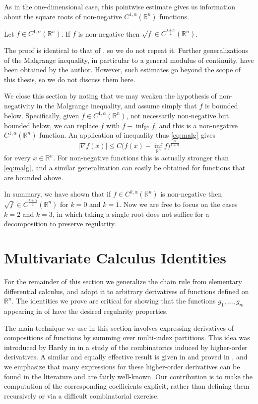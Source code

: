 \documentclass[oneside,hidelinks,indentfirst,10pt]{book}
\begin{document}
As in the one-dimensional case, this pointwise estimate gives us information about the square roots of non-negative \(C^{1,\alpha}(\mathbb{R}^n)\) functions.

\begin{cor}
Let \(f\in C^{1,\alpha}(\mathbb{R}^n)\). If \(f\) is non-negative then \(\sqrt{f}\in C^{\frac{1+\alpha}{2}}(\mathbb{R}^n)\).
\end{cor}


The proof is identical to that of , so we do not repeat it. Further generalizations of the Malgrange inequality, in particular to a general modulus of continuity, have been obtained by the author. However, such estimates go beyond the scope of this thesis, so we do not discuss them here. 


We close this section by noting that we may weaken the hypothesis of non-negativity in the Malgrange inequality, and assume simply that \(f\) is bounded below. Specifically, given \(f\in C^{1,\alpha}(\mathbb{R}^n)\), not necessarily non-negative but bounded below, we can replace \(f\) with \(f-\inf_{\mathbb{R}^n}f\), and this is a non-negative \(C^{1,\alpha}(\mathbb{R}^n)\) function. An application of inequality thus \eqref{eq:malg} gives
\[
    |\nabla f(x)|\leq C\big(f(x)-\inf_{\mathbb{R}^n} f\big)^\frac{\alpha}{1+\alpha}
\]
for every \(x\in\mathbb{R}^n\). For non-negative functions this is actually stronger than \eqref{eq:malg}, and a similar generalization can easily be obtained for functions that are bounded above.


In summary, we have shown that if \(f\in C^{k,\alpha}(\mathbb{R}^n)\) is non-negative then \(\sqrt{f}\in C^\frac{k+\alpha}{2}(\mathbb{R}^n)\) for \(k=0\) and \(k=1\). Now we are free to focus on the cases \(k=2\) and \(k=3\), in which taking a single root does not suffice for a decomposition to preserve regularity.


\section{Multivariate Calculus Identities}


For the remainder of this section we generalize the chain rule from elementary differential calculus, and adapt it to arbitrary derivatives of functions defined on \(\mathbb{R}^n\). The identities we prove are critical for showing that the functions \(g_1,\dots,g_m\) appearing in  of  have the desired regularity properties. 


The main technique we use in this section involves expressing derivatives of compositions of functions by summing over multi-index partitions. This idea was introduced by Hardy in \cite{hardy} in a study of the combinatorics induced by higher-order derivatives. A similar and equally effective result is given in \cite[Eq. (3.4)]{SOS_I} and proved in \cite{masur}, and we emphasize that many expressions for these higher-order derivatives can be found in the literature and are fairly well-known. Our contribution is to make the computation of the corresponding coefficients explicit, rather than defining them recursively or via a difficult combinatorial exercise.
\end{document}

